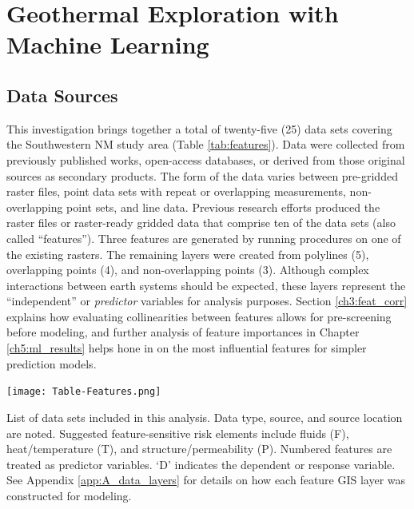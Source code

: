 \chapter{Geothermal Exploration with Machine Learning}\label{ch3:expl_ml_prep}
\section{Data Sources}\label{ch3:expl_data_src}
This investigation brings together a total of twenty-five (25) data sets covering the Southwestern NM study area (Table \ref{tab:features}). Data were collected from previously published works, open-access databases, or derived from those original sources as secondary products. The form of the data varies between pre-gridded raster files, point data sets with repeat or overlapping measurements, non-overlapping point sets, and line data. Previous research efforts produced the raster files or raster-ready gridded data that comprise ten of the data sets (also called ``features”). Three features are generated by running procedures on one of the existing rasters. The remaining layers were created from polylines (5), overlapping points (4), and non-overlapping points (3). Although complex interactions between earth systems should be expected, these layers represent the ``independent'' or \textit{predictor} variables for analysis purposes. Section \ref{ch3:feat_corr} explains how evaluating collinearities between features allows for pre-screening before modeling, and further analysis of feature importances in Chapter \ref{ch5:ml_results} helps hone in on the most influential features for simpler prediction models.

\begin{table}
\centering
\texttt{[image: Table-Features.png]}
\caption[Southwestern New Mexico feature list]{List of data sets included in this analysis. Data type, source, and source location are noted. Suggested feature-sensitive risk elements include fluids (F), heat/temperature (T), and structure/permeability (P). Numbered features are treated as predictor variables. `D' indicates the dependent or response variable. See Appendix \ref{app:A_data_layers} for details on how each feature GIS layer was constructed for modeling.}
\label{tab:features}
\end{table}

